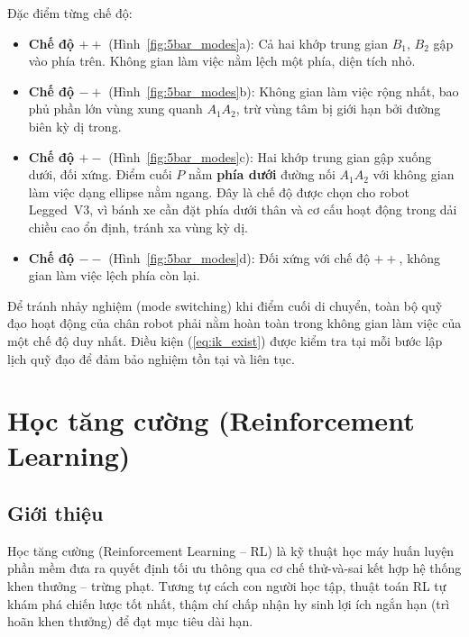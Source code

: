 Đặc điểm từng chế độ:
\begin{itemize}
    \item \textbf{Chế độ $++$} (Hình~\ref{fig:5bar_modes}a): Cả hai khớp
    trung gian $B_1$, $B_2$ gập vào phía trên. Không gian làm việc nằm lệch
    một phía, diện tích nhỏ.

    \item \textbf{Chế độ $-+$} (Hình~\ref{fig:5bar_modes}b): Không gian làm
    việc rộng nhất, bao phủ phần lớn vùng xung quanh $A_1A_2$, trừ vùng tâm
    bị giới hạn bởi đường biên kỳ dị trong.

    \item \textbf{Chế độ $+-$} (Hình~\ref{fig:5bar_modes}c): Hai khớp trung
    gian gập xuống dưới, đối xứng. Điểm cuối $P$ nằm \textbf{phía dưới}
    đường nối $A_1A_2$ với không gian làm việc dạng ellipse nằm ngang.
    Đây là chế độ được chọn cho robot Legged~V3, vì bánh xe cần đặt
    phía dưới thân và cơ cấu hoạt động trong dải chiều cao ổn định,
    tránh xa vùng kỳ dị.

    \item \textbf{Chế độ $--$} (Hình~\ref{fig:5bar_modes}d): Đối xứng với
    chế độ $++$, không gian làm việc lệch phía còn lại.
\end{itemize}

Để tránh nhảy nghiệm (mode switching) khi điểm cuối di chuyển, toàn bộ quỹ
đạo hoạt động của chân robot phải nằm hoàn toàn trong không gian làm việc
của một chế độ duy nhất. Điều kiện (\ref{eq:ik_exist}) được kiểm tra tại
mỗi bước lập lịch quỹ đạo để đảm bảo nghiệm tồn tại và liên tục.


\section{Học tăng cường (Reinforcement Learning)}

\subsection{Giới thiệu}

Học tăng cường (Reinforcement Learning -- RL) là kỹ thuật học máy huấn luyện
phần mềm đưa ra quyết định tối ưu thông qua cơ chế thử-và-sai kết hợp hệ thống
khen thưởng -- trừng phạt. Tương tự cách con người học tập, thuật toán RL tự
khám phá chiến lược tốt nhất, thậm chí chấp nhận hy sinh lợi ích ngắn hạn
(trì hoãn khen thưởng) để đạt mục tiêu dài hạn.

